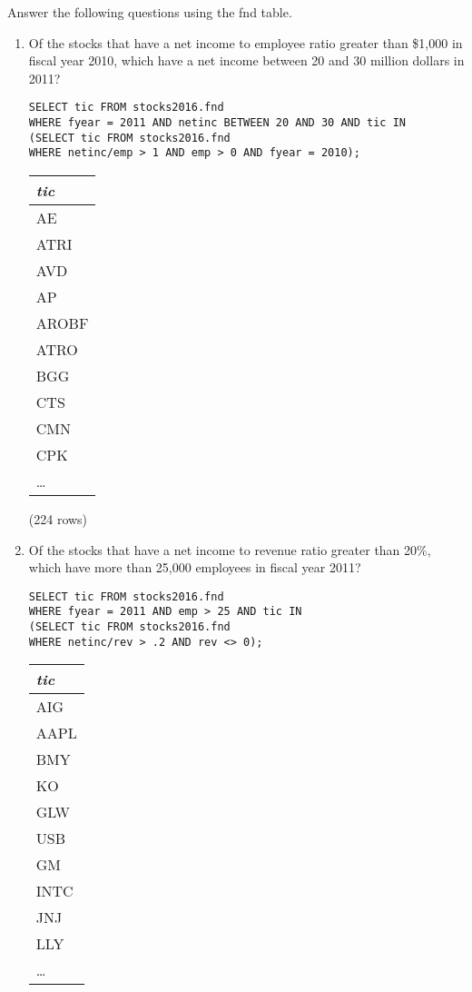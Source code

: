 \documentclass[]{article}
\newenvironment{question}[2][Question]{\begin{trivlist}
\item[\hskip \labelsep {\bfseries #1}\hskip \labelsep {\bfseries #2.}]}{\end{trivlist}}
\begin{document}
\begin{question}{2}
Answer the following questions using the fnd table.
\begin{enumerate}[label=(\alph*)]
\item Of the stocks that have a net income to employee ratio greater than \$1,000 in fiscal year 2010, which have a net income between 20 and 30 million dollars in 2011?
  \color{blue}
\begin{verbatim}
SELECT tic FROM stocks2016.fnd
WHERE fyear = 2011 AND netinc BETWEEN 20 AND 30 AND tic IN
(SELECT tic FROM stocks2016.fnd
WHERE netinc/emp > 1 AND emp > 0 AND fyear = 2010);
  \end{verbatim}
\color{black}

\begin{center}
\begin{tabular}{l}
\textit{tic} \\
\hline
AE \\
ATRI \\
AVD \\
AP \\
AROBF \\
ATRO \\
BGG \\
CTS \\
CMN \\
CPK \\
\ldots \\
\end{tabular}

\noindent (224 rows) \\
\end{center}

\item Of the stocks that have a net income to revenue ratio greater than 20\%, which have more than 25,000 employees in fiscal year 2011?
  \color{blue}
\begin{verbatim}
SELECT tic FROM stocks2016.fnd
WHERE fyear = 2011 AND emp > 25 AND tic IN
(SELECT tic FROM stocks2016.fnd
WHERE netinc/rev > .2 AND rev <> 0);
  \end{verbatim}
\color{black}

\begin{center}
\begin{tabular}{l}
\textit{tic} \\
\hline
AIG \\
AAPL \\
BMY \\
KO \\
GLW \\
USB \\
GM \\
INTC \\
JNJ \\
LLY \\
\ldots \\
\end{tabular}


\end{center}
\end{enumerate}
\end{question}
\end{document}
